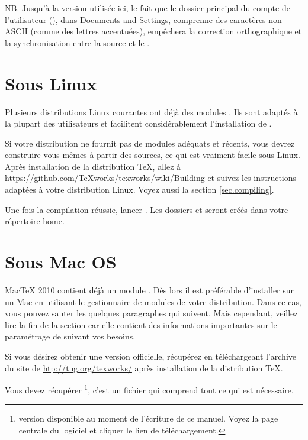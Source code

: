 NB. Jusqu'à la version utilisée ici, le fait que le dossier principal du compte de l'utilisateur (), dans \og Documents and Settings\fg, comprenne des caractères non-ASCII (comme des lettres accentuées), empêchera la correction orthographique et la synchronisation entre la source et le .

\section{Sous Linux}

Plusieurs distributions Linux courantes ont déjà des modules \Tw. Ils sont adaptés à la plupart des utilisateurs et facilitent considérablement l'installation de \Tw.

Si votre distribution ne fournit pas de modules adéquats et récents, vous devrez construire vous-mêmes \Tw{} à partir des sources, ce qui est vraiment facile sous Linux. Après installation de la distribution \TeX, allez à \url{https://github.com/TeXworks/texworks/wiki/Building} et suivez les instructions adaptées à votre distribution Linux. Voyez aussi la section \ref{sec.compiling}.

Une fois la compilation réussie, lancer \Tw{}. Les dossiers  et  seront créés dans votre répertoire home.

\section{Sous Mac OS}

MacTeX 2010 contient déjà un module \Tw. Dès lors il est préférable d'installer \Tw{} sur un Mac en utilisant le gestionnaire de modules de votre distribution. Dans ce cas, vous pouvez sauter les quelques paragraphes qui suivent. Mais cependant, veillez lire la fin de la section car elle contient des informations importantes sur le paramétrage de \Tw{} suivant vos besoins.

Si vous désirez obtenir une version \og officielle\fg{}, récupérez \Tw{} en téléchargeant l'archive du site de \Tw{} \url{htp://tug.org/texworks/} après installation de la distribution {\TeX}.

Vous devez récupérer \footnote{version disponible au moment de l'écriture de ce manuel. Voyez la page centrale du logiciel et cliquer le lien de téléchargement.}, c'est un fichier qui comprend tout ce qui est nécessaire.

